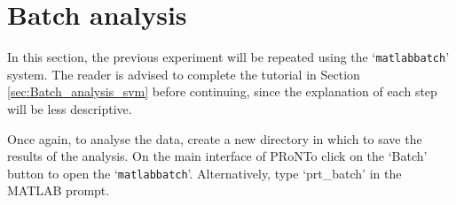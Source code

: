 



\section{Batch analysis}

In this section, the previous experiment will be repeated using the `\texttt{matlabbatch}' system. The reader is advised to complete the tutorial in Section \ref{sec:Batch_analysis_svm} before continuing, since the explanation of each step will be less descriptive.

Once again, to analyse the data, create a new directory in which to save the results of the analysis. On the main interface of PRoNTo click on the `Batch' button to open the `{\tt matlabbatch}'. Alternatively, type `prt\_batch' in the MATLAB prompt.

